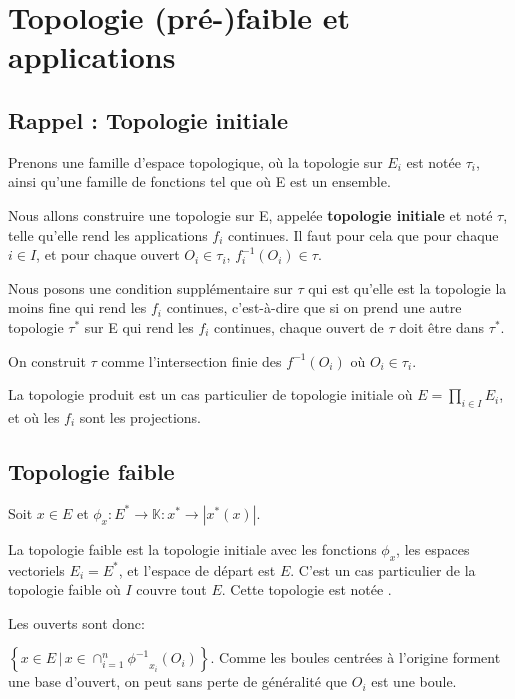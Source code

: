 \chapter{Topologie (pré-)faible et applications}

\section{Rappel : Topologie initiale}

Prenons une famille
 d'espace topologique, où la topologie sur $E_{i}$ est notée
$\tau_{i}$, ainsi qu'une famille de fonctions  tel que
 où E est un ensemble.

Nous allons construire une topologie sur E, appelée \textbf{topologie initiale}
et noté $\tau$, telle qu'elle rend les applications $f_{i}$ continues. Il faut
pour cela que pour chaque $i \in I$, et pour chaque ouvert $O_{i} \in \tau_{i}$,
$f_{i}^{-1}(O_{i}) \in \tau$.

Nous posons une condition supplémentaire sur $\tau$ qui est qu'elle est la
topologie la moins fine qui rend les $f_{i}$ continues, c'est-à-dire que si on
prend une autre topologie $\tau^{*}$ sur E qui rend les $f_{i}$ continues, chaque
ouvert de $\tau$ doit être dans $\tau^{*}$.

On construit $\tau$ comme l'intersection finie des $f^{-1}(O_{i})$ où $O_{i} \in
\tau_{i}$.

\begin{exemple}
	La topologie produit est un cas particulier de topologie initiale où $E =
	\displaystyle \prod_{i \in I} E_{i}$, et où les $f_{i}$ sont les projections.
\end{exemple}

\section{Topologie faible}

Soit $x \in E$ et $\phi_{x} : E^{*} \rightarrow \mathbb{K} : x^{*} \rightarrow
|x^{*}(x)|$.

La topologie faible est la topologie initiale avec les fonctions $\phi_{x}$, les
espaces vectoriels $E_{i} = E^{*}$, et l'espace de départ est $E$. C'est un cas
particulier de la topologie faible où $I$ couvre tout $E$. Cette topologie est
notée .

Les ouverts sont donc:

$\left\{ x \in E \, | \, x \in \displaystyle \cap_{i = 1}^{n}
{\phi^{-1}}_{{x_{i}}}(O_{i}) \right\}$. Comme les boules centrées à l'origine
forment une base d'ouvert, on peut sans perte de généralité que $O_{i}$ est une
boule.

